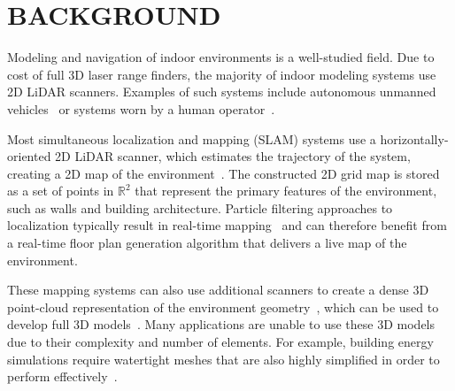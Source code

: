 \documentclass[a4paper,twoside]{article}
\begin{document}
\section{\uppercase{Background}}
\label{sec:background}

\noindent Modeling and navigation of indoor environments is a well-studied field.  Due to cost of full 3D laser range finders, the majority of indoor modeling systems use 2D LiDAR scanners.  Examples of such systems include autonomous unmanned vehicles~\cite{Quadrotor,SpectralClustering} or systems worn by a human operator~\cite{Backpack,MITBackpack}.

Most simultaneous localization and mapping (SLAM) systems use a horizontally-oriented 2D LiDAR scanner, which estimates the trajectory of the system, creating a 2D map of the environment~\cite{ProbabilisticRobotics}.  The constructed 2D grid map is stored as a set of points in $\mathbb{R}^2$ that represent the primary features of the environment, such as walls and building architecture.  Particle filtering approaches to localization typically result in real-time mapping~\cite{fastslam03,toro07} and can therefore benefit from a real-time floor plan generation algorithm that delivers a live map of the environment. 

These mapping systems can also use additional scanners to create a dense 3D point-cloud representation of the environment geometry~\cite{Sweep,Localization}, which can be used to develop full 3D models~\cite{Pons10,Carving}.  Many applications are unable to use these 3D models due to their complexity and number of elements.  For example, building energy simulations require watertight meshes that are also highly simplified in order to perform effectively~\cite{EnergyPlus}.

\end{document}
